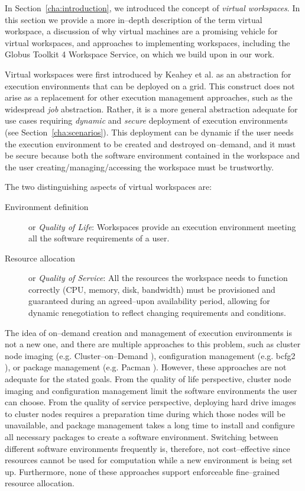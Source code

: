 \label{sec:vw}

In Section~\ref{cha:introduction}, we introduced the concept of \emph{virtual workspaces}. In this section we provide a more in--depth description of the term virtual workspace, a discussion of why virtual machines are a promising vehicle for virtual workspaces, and approaches to implementing workspaces, including the Globus Toolkit 4 \cite{DBLP:conf/npc/Foster05,globusweb} Workspace Service, on which we build upon in our work.

Virtual workspaces were first introduced by Keahey et al.\cite{VirtualWorkspaces05} as an abstraction for execution environments that can be deployed on a grid. This construct does not arise as a replacement for other execution management approaches, such as the widespread \emph{job} abstraction. Rather, it is a more general abstraction adequate for use cases requiring \emph{dynamic} and \emph{secure} deployment of execution environments (see Section~\ref{cha:scenarios}). This deployment can be dynamic if the user needs the execution environment to be created and destroyed on--demand, and it must be secure because both the software environment contained in the workspace and the user creating/managing/accessing the workspace must be trustworthy.

The two distinguishing aspects of virtual workspaces are:

\begin{description}
\item[Environment definition] or \emph{Quality of Life}: Workspaces provide an execution environment meeting all the software requirements of a user.
\item[Resource allocation] or \emph{Quality of Service}: All the resources the workspace needs to function correctly (CPU, memory, disk, bandwidth) must be provisioned and guaranteed during an agreed--upon availability period, allowing for dynamic renegotiation to reflect changing requirements and conditions.
\end{description}

The idea of on--demand creation and management of execution environments is not a new one, and there are multiple approaches to this problem, such as cluster node imaging (e.g. Cluster--on--Demand \cite{codweb}), configuration management (e.g. bcfg2 \cite{bcfg2web}), or package management (e.g. Pacman \cite{pacmanweb}). However, these approaches are not adequate for the stated goals. From the quality of life perspective, cluster node imaging and configuration management limit the software environments the user can choose. From the quality of service perspective, deploying hard drive images to cluster nodes requires a preparation time during which those nodes will be unavailable, and package management takes a long time to install and configure all necessary packages to create a software environment. Switching between different software environments frequently is, therefore, not cost--effective since resources cannot be used for computation while a new environment is being set up. Furthermore, none of these approaches support enforceable fine--grained resource allocation.


